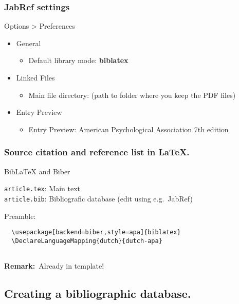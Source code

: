 \documentclass[aspectratio=169]{beamer}
\begin{document}
\begin{frame}
    \frametitle{JabRef settings}
    
   Options > Preferences

   \begin{itemize}
        \item General
        \begin{itemize}
            \item Default library mode: \textbf{biblatex}
        \end{itemize}
        \item Linked Files
        \begin{itemize}
            \item Main file directory: (path to folder where you keep the PDF files)
        \end{itemize}
        \item{Entry Preview}
        \begin{itemize}
            \item Entry Preview: American Psychological Association 7th edition
        \end{itemize}
    \end{itemize}

    
\end{frame}
\begin{frame}[fragile]
  \frametitle{Source citation and reference list in {\LaTeX}.}

  Bib{\LaTeX} and Biber

  \vspace{18pt}

  \verb|article.tex|: Main text\\
  \verb|article.bib|: Bibliografic database (edit using e.g.~JabRef)

  \bigskip

  Preamble:

  \begin{verbatim}
  \usepackage[backend=biber,style=apa]{biblatex}
  \DeclareLanguageMapping{dutch}{dutch-apa}
  
  \end{verbatim}

    \textbf{Remark:}\ Already in template!
    
\end{frame}

\subsection{Creating a bibliographic database.}
\end{document}

